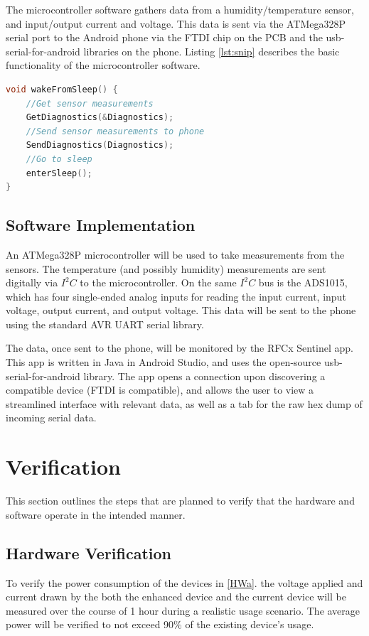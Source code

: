 \documentclass{article}
\numberwithin{figure}{section}
\numberwithin{equation}{section}
\begin{document}
{The microcontroller software gathers data from a humidity/temperature sensor, and input/output current and voltage. This data is sent via the ATMega328P serial port to the Android phone via the FTDI chip on the PCB and the usb-serial-for-android libraries on the phone.
Listing \ref{lst:snip} describes the basic functionality of the microcontroller software.

\begin{lstlisting}[language=C,label=lst:snip,caption=MCU Flow Code Snippet]
void wakeFromSleep() {
    //Get sensor measurements
    GetDiagnostics(&Diagnostics);
    //Send sensor measurements to phone
    SendDiagnostics(Diagnostics);
    //Go to sleep
    enterSleep();
}
\end{lstlisting}

\subsection{Software Implementation} \label{sect:softwareimp}

An ATMega328P microcontroller will be used to take measurements from the sensors. The temperature (and possibly humidity) measurements are sent digitally via $I^2 C$ to the microcontroller. On the same $I^2 C$ bus is the ADS1015, which has four single-ended analog inputs for reading the input current, input voltage, output current, and output voltage. This data will be sent to the phone using the standard AVR UART serial library.

The data, once sent to the phone, will be monitored by the RFCx Sentinel app. This app is written in Java in Android Studio, and uses the open-source usb-serial-for-android library. The app opens a connection upon discovering a compatible device (FTDI is compatible), and allows the user to view a streamlined interface with relevant data, as well as a tab for the raw hex dump of incoming serial data.

\section{Verification} \label{sect:verification}
This section outlines the steps that are planned to verify that the hardware and software operate in the intended manner.
\subsection{Hardware Verification} \label{sect:hardwareverification}
To verify the power consumption of the devices in \ref{HWa}. the voltage applied and current drawn by the both the enhanced device and the current device will be measured over the course of 1 hour during a realistic usage scenario. The average power will be verified to not exceed 90\% of the existing device’s usage.

}
\end{document}
